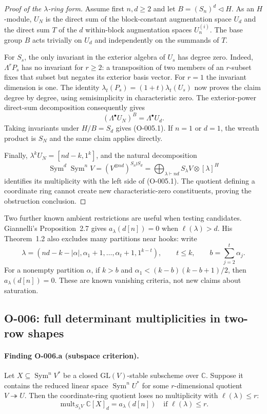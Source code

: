 \begin{proof}[Proof of the $\lambda$-ring form]
Assume first $n,d\geq2$ and let $B=(S_n)^d\triangleleft H$.
As an $H$-module, $U_N$ is the direct sum of the block-constant
augmentation space $U_d$ and the direct sum $T$ of the $d$ within-block
augmentation spaces $U_n^{(i)}$.  The base group $B$ acts trivially on
$U_d$ and independently on the summands of $T$.

For $S_s$, the only invariant in the exterior algebra of $U_s$ has
degree zero. Indeed, $\Lambda^r P_s$ has no invariant for $r\geq2$:
a transposition of two members of an $r$-subset fixes that subset but
negates its exterior basis vector. For $r=1$ the invariant dimension
is one. The identity
$\lambda_t(P_s)=(1+t)\lambda_t(U_s)$ now proves the claim degree by
degree, using semisimplicity in characteristic zero.
The exterior-power direct-sum decomposition consequently gives
\[
       (\Lambda^\bullet U_N)^B=\Lambda^\bullet U_d.
\]
Taking invariants under $H/B=S_d$ gives (O-005.1).  If $n=1$ or
$d=1$, the wreath product is $S_N$ and the same claim applies directly.

Finally, $\lambda^k U_N=[nd-k,1^k]$, and the natural decomposition
\[
 \operatorname{Sym}^d\operatorname{Sym}^n V
       =(V^{\otimes nd})^{S_n\wr S_d}
       =\bigoplus_{\lambda\vdash nd}S_\lambda V
                         \otimes[\lambda]^H
\]
identifies its multiplicity with the left side of (O-005.1).
The quotient defining a coordinate ring cannot create new
characteristic-zero constituents, proving the obstruction conclusion.
\end{proof}

Two further known ambient restrictions are useful when testing
candidates. Giannelli's Proposition~2.7 gives
$a_\lambda(d[n])=0$ when $\ell(\lambda)>d$. His Theorem~1.2
also excludes many partitions near hooks: write
\[
 \lambda=(nd-k-|\alpha|,\alpha_1+1,\ldots,\alpha_t+1,1^{k-t}),
 \qquad t\leq k,\qquad b=\sum_{j=2}^{t}\alpha_j.
\]
For a nonempty partition $\alpha$, if $k>b$ and
$\alpha_1<(k-b)(k-b+1)/2$, then $a_\lambda(d[n])=0$.
These are known vanishing criteria, not new claims about saturation.

\subsection{O-006: full determinant multiplicities in two-row shapes}

\paragraph{Finding O-006.a (subspace criterion).}
Let $X\subseteq\operatorname{Sym}^n V^*$ be a closed
$\mathrm{GL}(V)$-stable subscheme over $\mathbb C$. Suppose it contains
the reduced linear space $\operatorname{Sym}^n U^*$ for some
$r$-dimensional quotient $V\twoheadrightarrow U$.
Then the coordinate-ring quotient loses no multiplicity with
$\ell(\lambda)\leq r$:
\[
 \operatorname{mult}_{S_\lambda V}\mathbb C[X]_d
                         =a_\lambda(d[n])
              \quad\text{if }\ell(\lambda)\leq r.       \tag{O-006.1}
\]


